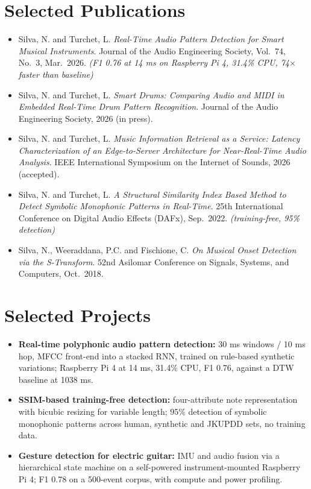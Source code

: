 \documentclass[11pt]{article}
\begin{document}
\section*{Selected Publications \footnotesize {}}
\begin{itemize}[leftmargin=1.2em, itemsep=-0.25em]
    \item Silva, N. and Turchet, L. \textit{Real-Time Audio Pattern Detection for Smart Musical Instruments}. Journal of the Audio Engineering Society, Vol.~74, No.~3, Mar.~2026. \textit{(F1 0.76 at 14 ms on Raspberry Pi 4, 31.4\% CPU, 74$\times$ faster than baseline)}
    \item Silva, N. and Turchet, L. \textit{Smart Drums: Comparing Audio and MIDI in Embedded Real-Time Drum Pattern Recognition}. Journal of the Audio Engineering Society, 2026 (in press).
    \item Silva, N. and Turchet, L. \textit{Music Information Retrieval as a Service: Latency Characterization of an Edge-to-Server Architecture for Near-Real-Time Audio Analysis}. IEEE International Symposium on the Internet of Sounds, 2026 (accepted).
    \item Silva, N. and Turchet, L. \textit{A Structural Similarity Index Based Method to Detect Symbolic Monophonic Patterns in Real-Time}. 25th International Conference on Digital Audio Effects (DAFx), Sep.~2022. \textit{(training-free, 95\% detection)}
    \item Silva, N., Weeraddana, P.C. and Fischione, C. \textit{On Musical Onset Detection via the S-Transform}. 52nd Asilomar Conference on Signals, Systems, and Computers, Oct.~2018.
\end{itemize}

\section*{Selected Projects \footnotesize {}}
\begin{itemize}[leftmargin=1.2em, itemsep=-0.25em]
    \item \textbf{Real-time polyphonic audio pattern detection:} 30 ms windows / 10 ms hop, MFCC front-end into a stacked RNN, trained on rule-based synthetic variations; Raspberry Pi 4 at 14 ms, 31.4\% CPU, F1 0.76, against a DTW baseline at 1038 ms.
    \item \textbf{SSIM-based training-free detection:} four-attribute note representation with bicubic resizing for variable length; 95\% detection of symbolic monophonic patterns across human, synthetic and JKUPDD sets, no training data.
    \item \textbf{Gesture detection for electric guitar:} IMU and audio fusion via a hierarchical state machine on a self-powered instrument-mounted Raspberry Pi 4; F1 0.78 on a 500-event corpus, with compute and power profiling.
\end{itemize}
\end{document}
